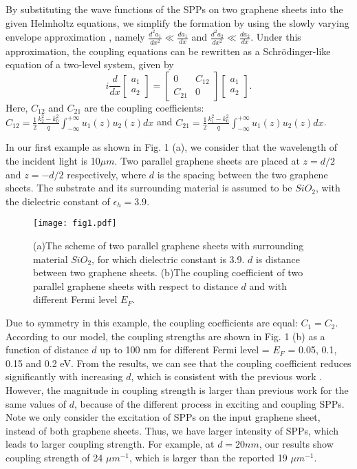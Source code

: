 \documentclass[preprint,12pt,numbers,sort&compress]{elsarticle}
\begin{document}
By substituting the wave functions of the SPPs on two graphene sheets into the given Helmholtz equations, we simplify the formation by using the slowly varying envelope approximation \cite{Saleh91}, namely $\frac{d^2 a_1}{dx^2} \ll \frac{d a_1}{dx}$ and $\frac{d^2 a_2}{dx^2} \ll \frac{d a_2}{dx}$.
Under this approximation, the coupling equations can be rewritten as a Schr\"odinger-like equation of a two-level system, given by
\begin{equation}
i\dfrac{d}{d x}
\begin{bmatrix}
a_{1} \\
a_{2}
\end{bmatrix}
= \begin{bmatrix}
0 & C_{12} \\
C_{21}  & 0
\end{bmatrix} \begin{bmatrix}
a_{1} \\
a_{2}
\end{bmatrix}.
\end{equation}
Here, $C_{12}$ and $C_{21}$ are the coupling coefficients: $C_{12} = \frac{1}{2} \frac{k_{2}^2 - k_0^2}{q}  \int^{+\infty}_{-\infty} u_{1}(z) u_{2}(z) dx$ and $C_{21} = \frac{1}{2} \frac{k_{1}^2 - k_0^2}{q}  \int^{+\infty}_{-\infty} u_{1}(z) u_{2}(z) dx$.

In our first example as shown in Fig. 1 (a), we consider that the wavelength of the incident light is 10$\mu m$.
Two parallel graphene sheets are placed at $z=d/2$ and $z=-d/2$ respectively, where $d$ is the spacing between the two graphene sheets.
The substrate and its surrounding material is assumed to be $SiO_2$, with the dielectric constant of $\epsilon_h = 3.9$.

\begin{figure}[hbtp]
\centering
\texttt{[image: fig1.pdf]}
\caption{(a)The scheme of two parallel graphene sheets with surrounding material $SiO_2$, for which dielectric constant is 3.9. $d$ is distance between two graphene sheets. (b)The coupling coefficient of two parallel graphene sheets with respect to distance $d$ and with different Fermi level $E_{F}$.}
\end{figure}

Due to symmetry in this example, the coupling coefficients are equal: $C_1=C_2$.
According to our model, the coupling strengths are shown in Fig. 1 (b) as a function of distance $d$ up to 100 nm for different Fermi level = $E_F$ = 0.05, 0.1, 0.15 and 0.2 eV.
From the results, we can see that the coupling coefficient reduces significantly with increasing $d$, which is consistent with the previous work \cite{Wang12}.
However, the magnitude in coupling strength is larger than previous work for the same values of $d$, because of the different process in exciting and coupling SPPs.
Note we only consider the excitation of SPPs on the input graphene sheet, instead of both graphene sheets. Thus, we have larger intensity of SPPs, which leads to larger coupling strength.
For example, at $d=20 nm$, our results show coupling strength of 24 $\mu m^{-1}$, which is larger than the reported 19 $\mu m^{-1}$.
\end{document}
